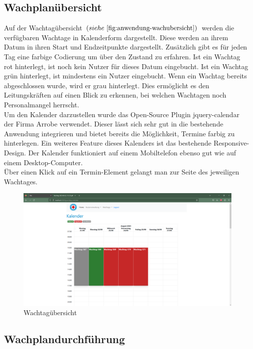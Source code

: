 \documentclass[fontsize=12pt,openright,oneside,paper=a4,BCOR=1cm]{scrbook}
\begin{document}
\subsection{Wachplanübersicht}

Auf der Wachtag\"ubersicht $(siehe~\ref{fig:anwendung-wachubersicht})$ werden die verf\"ugbaren Wachtage in Kalenderform dargestellt. Diese werden an ihrem Datum in ihren Start und Endzeitpunkte dargestellt. Zus\"atzlich gibt es f\"ur jeden Tag eine farbige Codierung um \"uber den Zustand zu erfahren. Ist ein Wachtag rot hinterlegt, ist noch kein Nutzer f\"ur dieses Datum eingebucht. Ist ein Wachtag gr\"un hinterlegt, ist mindestens ein Nutzer eingebucht. Wenn ein Wachtag bereits abgeschlossen wurde, wird er grau hinterlegt. Dies erm\"oglicht es den Leitungskr\"aften auf einen Blick zu erkennen, bei welchen Wachtagen noch Personalmangel herrscht. \\
Um den Kalender darzustellen wurde das Open-Source Plugin \glqq jquery-calendar\grqq{} der Firma \glqq Arrobe\grqq{} verwendet. Dieser lässt sich sehr gut in die bestehende Anwendung integrieren und bietet bereits die M\"oglichkeit, Termine farbig zu hinterlegen. Ein weiteres Feature dieses Kalenders ist das bestehende Responsive-Design. Der Kalender funktioniert auf einem Mobiltelefon ebenso gut wie auf einem Desktop-Computer. \\
\"Uber einen Klick auf ein Termin-Element gelangt man zur Seite des jeweiligen Wachtages.

\begin{figure}[H]
  \centering
    \includegraphics[width=0.7\linewidth]{Anlagen/Anwendung/7UebersichtGebucht.png}
    \caption{Wachtag\"ubersicht}
  \label{fig:anwendung-wachubersicht}
\end{figure}

\subsection {Wachplandurchführung}
\end{document}
